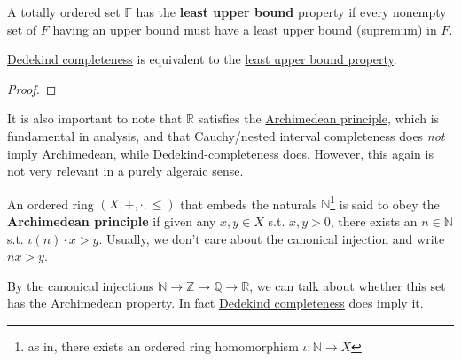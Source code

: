   \begin{definition}
    \label{def:least-upper-bound-property}
    A totally ordered set $\mathbb{F}$ has the \textbf{least upper bound} property if every nonempty set of $F$ having an upper bound must have a least upper bound (supremum) in $F$. 
  \end{definition} 

  \begin{theorem}
    \label{thm:dedekind-completeness-equals-least-upper-bound}
    \hyperref[def:dedekind-completeness]{Dedekind completeness} is equivalent to the \hyperref[def:least-upper-bound-property]{least upper bound property}. 
  \end{theorem}
  \begin{proof}
    
  \end{proof}

  It is also important to note that $\mathbb{R}$ satisfies the \hyperref[def:archimedean-principle]{Archimedean principle}, which is fundamental in analysis, and that Cauchy/nested interval completeness does \textit{not} imply Archimedean, while Dedekind-completeness does. However, this again is not very relevant in a purely algeraic sense. 

  \begin{definition}
    \label{def:archimedean-principle}
    An ordered ring $(X, +, \cdot, \leq)$ that embeds the naturals $\mathbb{N}$\footnote{as in, there exists an ordered ring homomorphism $\iota: \mathbb{N} \rightarrow X$} is said to obey the \textbf{Archimedean principle} if given any $x, y \in X$ s.t. $x, y > 0$, there exists an $n \in \mathbb{N}$ s.t. $\iota(n) \cdot x > y$. Usually, we don't care about the canonical injection and write $nx > y$. 
  \end{definition}

  By the canonical injections $\mathbb{N} \rightarrow \mathbb{Z} \rightarrow \mathbb{Q} \rightarrow \mathbb{R}$, we can talk about whether this set has the Archimedean property. In fact \hyperref[def:dedekind-completeness]{Dedekind completeness} does imply it. 

